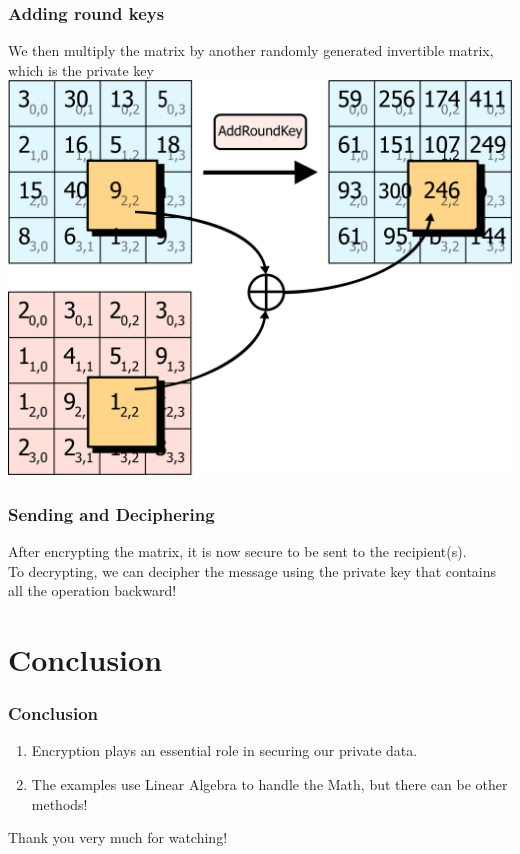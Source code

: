 \documentclass[11pt]{beamer}
\begin{document}
\begin{frame}\frametitle{Adding round keys}
	We then multiply the matrix by another randomly generated invertible matrix, which is the private key
	\center \includegraphics[scale=0.25]{add_round_key}
\end{frame}

\begin{frame}\frametitle{Sending and Deciphering}
	After encrypting the matrix, it is now secure to be sent to the recipient(s).\\
	To decrypting, we can decipher the message using the private key that contains all the operation backward!
\end{frame}

\section{Conclusion}
\begin{frame}\frametitle{Conclusion}
	\begin{enumerate}[]
	\item Encryption plays an essential role in securing our private data.
	\item The examples use Linear Algebra to handle the Math, but there can be other methods!
	\end{enumerate}
\end{frame}

\begin{frame}
	\center Thank you very much for watching!
\end{frame}
\end{document}
